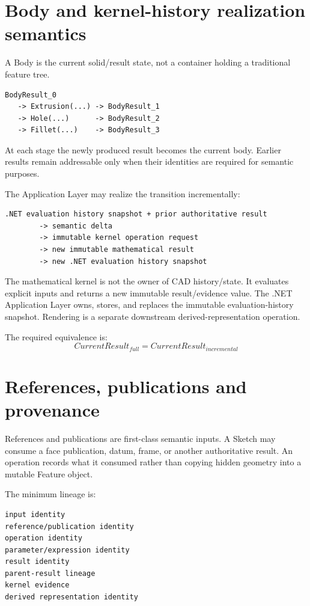 \documentclass[11pt,a4paper]{report}
\begin{document}
\section{Body and kernel-history realization semantics}

A Body is the current solid/result state, not a container holding a traditional feature tree.

\begin{lstlisting}
BodyResult_0
   -> Extrusion(...) -> BodyResult_1
   -> Hole(...)      -> BodyResult_2
   -> Fillet(...)    -> BodyResult_3
\end{lstlisting}

At each stage the newly produced result becomes the current body. Earlier results remain addressable only when their identities are required for semantic purposes.

The Application Layer may realize the transition incrementally:

\begin{lstlisting}
.NET evaluation history snapshot + prior authoritative result
        -> semantic delta
        -> immutable kernel operation request
        -> new immutable mathematical result
        -> new .NET evaluation history snapshot
\end{lstlisting}

The mathematical kernel is not the owner of CAD history/state. It evaluates explicit inputs and returns a new immutable result/evidence value. The .NET Application Layer owns, stores, and replaces the immutable evaluation-history snapshot. Rendering is a separate downstream derived-representation operation.

The required equivalence is:
\[
CurrentResult_{full}=CurrentResult_{incremental}
\]

\section{References, publications and provenance}

References and publications are first-class semantic inputs. A Sketch may consume a face publication, datum, frame, or another authoritative result. An operation records what it consumed rather than copying hidden geometry into a mutable Feature object.

The minimum lineage is:

\begin{lstlisting}
input identity
reference/publication identity
operation identity
parameter/expression identity
result identity
parent-result lineage
kernel evidence
derived representation identity
\end{lstlisting}
\end{document}
